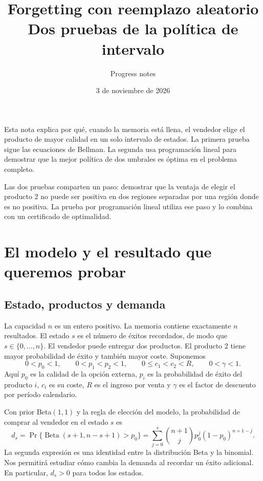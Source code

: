 \documentclass[11pt,a4paper]{article}
\title{Forgetting con reemplazo aleatorio\\[0.35em]
\large Dos pruebas de la política de intervalo}
\author{Progress notes}
\date{3 de noviembre de 2026}
\begin{document}
\maketitle

Esta nota explica por qué, cuando la memoria está llena, el vendedor
elige el producto de mayor calidad en un solo intervalo de estados.
La primera prueba sigue las ecuaciones de Bellman. La segunda usa
programación lineal para demostrar que la mejor política de dos
umbrales es óptima en el problema completo.

Las dos pruebas comparten un paso: demostrar que la ventaja de elegir
el producto 2 no puede ser positiva en dos regiones separadas por una
región donde es no positiva. La prueba por programación lineal utiliza
ese paso y lo combina con un certificado de optimalidad.

\section{El modelo y el resultado que queremos probar}

\subsection{Estado, productos y demanda}

La capacidad $n$ es un entero positivo. La memoria contiene exactamente
$n$ resultados. El estado $s$ es el
número de éxitos recordados, de modo que $s\in\{0,\ldots,n\}$.
El vendedor puede entregar dos productos. El producto 2 tiene mayor
probabilidad de éxito y también mayor coste. Suponemos
\begin{equation}
0<p_0<1,\qquad 0<p_1<p_2<1,\qquad
0\le c_1<c_2<R,\qquad 0<\gamma<1.
\label{eq:supuestos}
\end{equation}
Aquí $p_0$ es la calidad de la opción externa, $p_i$ es la probabilidad
de éxito del producto $i$, $c_i$ es su coste, $R$ es el ingreso por
venta y $\gamma$ es el factor de descuento por período calendario.

Con prior Beta$(1,1)$ y la regla de elección del modelo, la probabilidad
de comprar al vendedor en el estado $s$ es
\begin{equation}
d_s=\Pr\{\operatorname{Beta}(s+1,n-s+1)>p_0\}
   =\sum_{j=0}^{s}\binom{n+1}{j}p_0^j(1-p_0)^{n+1-j}.
\label{eq:demand}
\end{equation}
La segunda expresión es una identidad entre la distribución Beta y la
binomial. Nos permitirá estudiar cómo cambia la demanda al recordar
un éxito adicional. En particular, $d_s>0$ para todos los estados.
\end{document}

